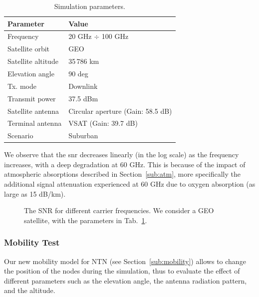 \begin{table}[t!]
\caption{Simulation parameters.}
\label{tab:frequency-test}
\centering
\footnotesize
\begin{tabular}{|l|l|}
\hline
\textbf{Parameter} & \textbf{Value} \\ \hline
{Frequency} & {20 GHz $\div$ 100 GHz} \\\hline
{Satellite orbit} & {GEO} \\\hline
{Satellite altitude} & {35\,786 km} \\\hline
{Elevation angle} & {90 deg} \\\hline
{Tx. mode} & {Downlink} \\\hline
{Transmit power} & {37.5 dBm} \\\hline
{Satellite  antenna} & {Circular aperture (Gain: 58.5 dB)} \\\hline
{Terminal antenna} & {VSAT (Gain: 39.7 dB)} \\\hline
 {Scenario} & {Suburban} \\\hline
\end{tabular}
\end{table}

We observe that the \gls{snr} decreases linearly (in the log scale) as the frequency increases, with a deep degradation at 60 GHz. This is because of the impact of atmospheric absorptions described in Section~\ref{sub:atm}, more specifically the additional signal attenuation experienced at 60 GHz due to oxygen absorption (as large as 15 dB/km).

\begin{figure}[t]
    \centering 
    \setlength{}
    \setlength{}
    
    \caption{The SNR for different carrier frequencies. We consider a GEO satellite, with the parameters in Tab.~\ref{tab:frequency-test}.}
    \label{fig:frequency-test}
\end{figure}

\subsubsection{Mobility Test}
Our new mobility model for NTN (see Section~\ref{sub:mobility}) allows to change the position of the nodes during the simulation, thus to evaluate the effect of different parameters such as the elevation angle, the antenna radiation pattern, and the altitude. 

